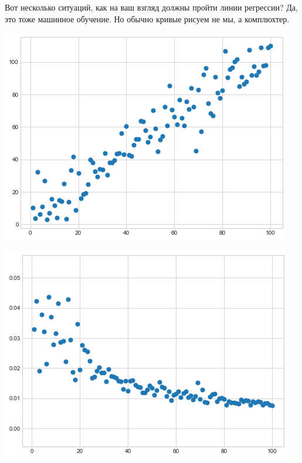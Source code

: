 \documentclass[12pt, a4paper, oneside]{article}
\theoremstyle{plain} %
\theoremstyle{definition}
\begin{document}
\begin{problem}{ }
Вот несколько ситуаций, как на ваш взгляд должны пройти линии регрессии? Да, это тоже машинное обучение. Но обычно кривые рисуем не мы, а комплюхтер.

\begin{minipage}[t]{0.45\textwidth}
	\includegraphics[scale=0.38]{regr_pic_1.png}
\end{minipage}
\hfill
\begin{minipage}[t]{0.45\textwidth}
	\includegraphics[scale=0.38]{regr_pic_2.png}
\end{minipage}


\end{problem}
\end{document}
